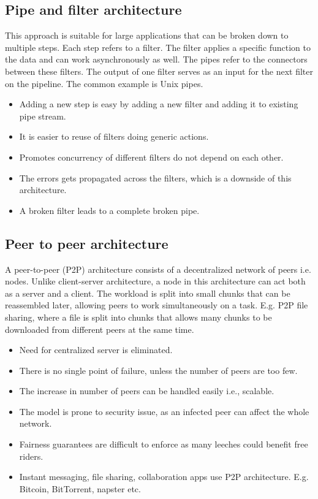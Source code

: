 \documentclass[conference]{IEEEtran}
\begin{document}
\subsection{Pipe and filter architecture} 
This approach is suitable for large applications that can be broken down to multiple steps. Each step refers to a filter. The filter applies a specific function to the data and can work asynchronously as well. The pipes refer to the connectors between these filters. The output of one filter serves as an input for the next filter on the pipeline. The common example is Unix pipes. 
\begin{itemize}
\item Adding a new step is easy by adding a new filter and adding it to existing pipe stream.
\item It is easier to reuse of filters doing generic actions.
\item Promotes concurrency of different filters do not depend on each other.
\item The errors gets propagated across the filters, which is a downside of this architecture.
\item A broken filter leads to a complete broken pipe.
\end{itemize}

\subsection{Peer to peer architecture}
A peer-to-peer (P2P) architecture \cite{peer2peer} consists of a decentralized network of peers i.e. nodes. Unlike client-server architecture, a node in this architecture can act both as a server and a client. The workload is split into small chunks that can be reassembled later, allowing peers to work simultaneously on a task. E.g. P2P file sharing, where a file is split into chunks that allows many chunks to be downloaded from different peers at the same time.
\begin{itemize}
\item Need for centralized server is eliminated.
\item There is no single point of failure, unless the number of peers are too few.
\item The increase in number of peers can be handled easily i.e., scalable.
\item The model is prone to security issue, as an infected peer can affect the whole network.
\item Fairness guarantees are difficult to enforce as many leeches could benefit free riders.
\item Instant messaging, file sharing, collaboration apps use P2P architecture. E.g. Bitcoin, BitTorrent, napster etc.
\end{itemize}
\end{document}

